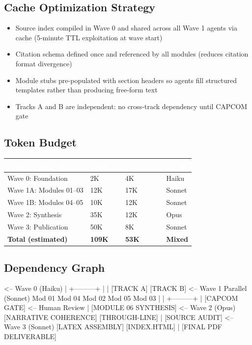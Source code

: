 \documentclass[11pt,letterpaper]{article}
\newcommand{\tableheader}[1]{\textbf{\sffamily\textcolor{white}{#1}}}
\begin{document}
\subsection{Cache Optimization Strategy}

\begin{itemize}[leftmargin=1.5em]
  \item Source index compiled in Wave 0 and shared across all Wave 1 agents via cache (5-minute TTL exploitation at wave start)
  \item Citation schema defined once and referenced by all modules (reduces citation format divergence)
  \item Module stubs pre-populated with section headers so agents fill structured templates rather than producing free-form text
  \item Tracks A and B are independent: no cross-track dependency until CAPCOM gate
\end{itemize}

\subsection{Token Budget}

\begin{center}
\begin{tabularx}{\textwidth}{L{4cm}C{2cm}C{2cm}C{2.5cm}}
\toprule
{}
\tableheader{Wave / Component} & \tableheader{Input K} & \tableheader{Output K} & \tableheader{Model} \\
\midrule
Wave 0: Foundation & 2K & 4K & Haiku \\
Wave 1A: Modules 01--03 & 12K & 17K & Sonnet \\
Wave 1B: Modules 04--05 & 10K & 12K & Sonnet \\
Wave 2: Synthesis & 35K & 12K & Opus \\
Wave 3: Publication & 50K & 8K & Sonnet \\
\midrule
\textbf{Total (estimated)} & \textbf{109K} & \textbf{53K} & \textbf{Mixed} \\
\bottomrule
\end{tabularx}
\end{center}

\subsection{Dependency Graph}

\begin{asciibox}
  <-- Wave 0 (Haiku)
         |
    +---------+
    |         |
[TRACK A] [TRACK B]        <-- Wave 1 Parallel (Sonnet)
  Mod 01    Mod 04
  Mod 02    Mod 05
  Mod 03
    |         |
    +---------+
         |
   [CAPCOM GATE]           <-- Human Review
         |
  [MODULE 06 SYNTHESIS]    <-- Wave 2 (Opus)
  [NARRATIVE COHERENCE]
  [THROUGH-LINE]
         |
  [SOURCE AUDIT]           <-- Wave 3 (Sonnet)
  [LATEX ASSEMBLY]
  [INDEX.HTML]
         |
  [FINAL PDF DELIVERABLE]
\end{asciibox}
\end{document}

